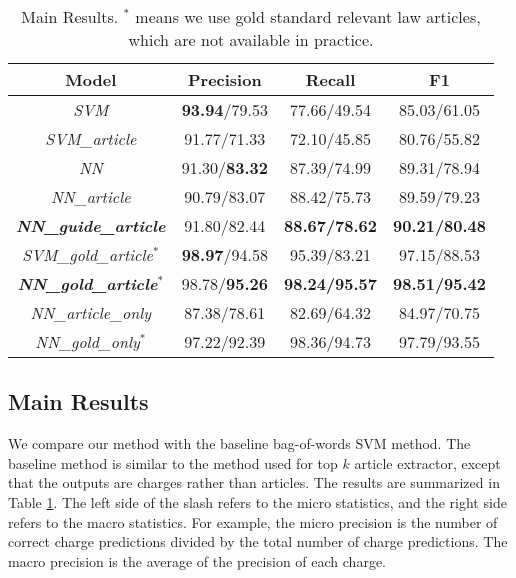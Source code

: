 \begin{table}
\centering
\small{
\begin{tabular}{|c|c|c|c|}
\hline
\textbf{Model}				& \textbf{Precision} 	& \textbf{Recall} 		& \textbf{F1} 	\\
\hline
\textit{SVM} 				& \textbf{93.94}/79.53					& 77.66/49.54  					& 85.03/61.05 				 	\\
\hline
\textit{SVM\_article} 			& 91.77/71.33					& 72.10/45.85  					& 80.76/55.82				 	\\
\hline
\textit{NN}				& 91.30/\textbf{83.32}			& 87.39/74.99  					& 89.31/78.94					\\
\hline
\textit{NN\_article}			& 90.79/83.07					& 88.42/75.73  					& 89.59/79.23					\\
\hline
\textbf{\textit{NN\_guide\_article}} 	& 91.80/82.44 					& \textbf{88.67/78.62} 			& \textbf{90.21/80.48} 		 	\\
\hline
\hline
\textit{SVM\_gold\_article$^*$} 	& \textbf{98.97}/94.58			& 95.39/83.21  					& 97.15/88.53					\\
\hline
\textbf{\textit{NN\_gold\_article$^*$}} 		& 98.78/\textbf{95.26} 			& \textbf{98.24/95.57} 			& \textbf{98.51/95.42} 			\\
\hline
\hline
\textit{NN\_article\_only} 			& 87.38/78.61				& 82.69/64.32				& 84.97/70.75		\\
\hline
\textit{NN\_gold\_only$^*$} 		& 97.22/92.39				& 98.36/94.73				& 97.79/93.55		\\
\hline
\end{tabular}
}
\caption{Main Results. $^*$ means we use gold standard relevant law articles, which are not available in practice.}
\label{tabble_main_results}
\end{table}


\subsection{Main Results}
\label{sec_main_results}
We compare our method with the baseline bag-of-words SVM method. The baseline method is similar to the method used for top $k$ article extractor, except that the outputs are charges rather than articles. The results are summarized in Table \ref{tabble_main_results}. The left side of the slash refers to the micro statistics, and the right side refers to the macro statistics. For example, the micro precision is the number of correct charge predictions divided by the total number of charge predictions. The macro precision is the average of the precision of each charge. %

